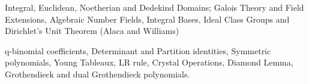 \documentclass[]{deedy-resume-openfont}
\begin{document}
\begin{minipage}[t]{0.55\textwidth}
 
\small Integral, Euclidean, Noetherian and Dedekind Domains; Galois Theory and Field Extensions, Algebraic Number Fields, Integral Bases, Ideal Class Groups and Dirichlet's Unit Theorem (Alaca and Williams) 
\sectionsep

\small q-binomial coefficients, Determinant and Partition identities,
Symmetric polynomials,
Young Tableaux, LR rule, Crystal Operations, Diamond Lemma, Grothendieck and dual Grothendieck polynomials.
\sectionsep





\end{minipage}
\end{document}
